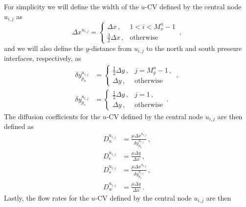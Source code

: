 \documentclass{article}
\begin{document}
For simplicity we will define the width of the $u$-CV defined by the central node $u_{i,j}$ as
\begin{equation}
	\Delta x^{u_{i,j}} = \begin{cases}
		\Delta x\,, & 1 < i < M_x^u - 1 \\
		\frac{3}{2} \Delta x\,, & \text{otherwise}
	\end{cases}\,,
\end{equation}
and we will also define the $y$-distance from $u_{i,j}$ to the north and south pressure interfaces, respectively, as
\begin{subequations}
	\begin{align}
		\delta y^{u_{i,j}}_{p_n} & = \begin{cases}
		\frac{1}{2} \Delta y\,, & j = M_y^u - 1\,, \\
		\Delta y\,, & \text{otherwise}
		\end{cases}\,, \\
		\delta y^{u_{i,j}}_{p_s} & = \begin{cases}
		\frac{1}{2} \Delta y\,, & j = 1\,, \\
		\Delta y\,, & \text{otherwise}
		\end{cases}\,.
	\end{align}
\end{subequations}
The diffusion coefficients for the $u$-CV defined by the central node $u_{i,j}$ are then defined as
\begin{subequations}
	\begin{align}
		D_n^{u_{i,j}} & = \frac{\mu \Delta x^{u_{i,j}}}{\delta y^{u_{i,j}}_{p_n}}\,,\\
		D_e^{u_{i,j}} & = \frac{\mu\Delta y}{\Delta x}\,,\\
		D_s^{u_{i,j}} & = \frac{\mu \Delta x^{u_{i,j}}}{\delta y^{u_{i,j}}_{p_s}}\,,\\
		D_w^{u_{i,j}} & = \frac{\mu\Delta y}{\Delta x}\,.
	\end{align}
\end{subequations}
Lastly, the flow rates for the $u$-CV defined by the central node $u_{i,j}$ are then
\end{document}
